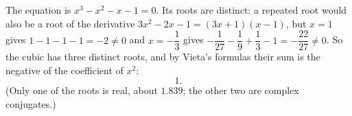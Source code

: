 The equation is $x^3-x^2-x-1=0$. Its roots are distinct: a repeated root would also be a root of the derivative $3x^2-2x-1=(3x+1)(x-1)$, but $x=1$ gives $1-1-1-1=-2\ne0$ and $x=-\dfrac{1}{3}$ gives $-\dfrac{1}{27}-\dfrac{1}{9}+\dfrac{1}{3}-1=-\dfrac{22}{27}\ne0$. So the cubic has three distinct roots, and by Vieta's formulas their sum is the negative of the coefficient of $x^2$:
\[
\boxed{1}.
\]
(Only one of the roots is real, about $1.839$; the other two are complex conjugates.)
